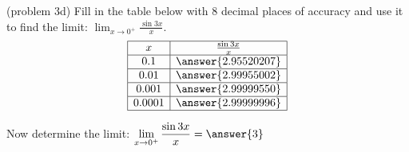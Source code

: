 \documentclass[handout]{ximera}
\begin{document}
\begin{problem}(problem 3d)
Fill in the table below with 8 decimal places of accuracy and use it to find the limit: $\displaystyle \lim_{x \to 0^+} \frac{\sin 3x}{x}.$\\

\[
\begin{array}{| c | c |}
	\hline
	x& \frac{\sin 3x}{x} \\
	\hline
	0.1 & \answer{2.95520207} \\
	\hline
	0.01 & \answer{2.99955002}\\
	\hline
	0.001 & \answer{2.99999550}\\
	\hline
	0.0001 & \answer{2.99999996}\\
	\hline
\end{array}
\]

Now determine the limit: $\displaystyle \lim_{x \to 0^+} \frac{\sin 3x}{x} = \answer{3}$
\end{problem}
\end{document}
